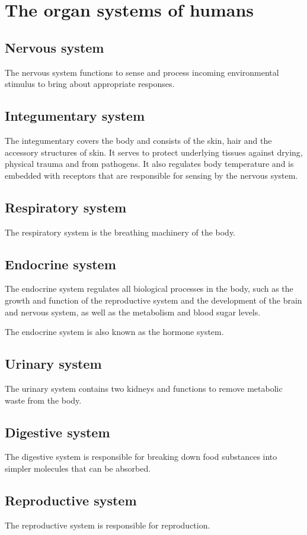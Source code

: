 \documentclass[11pt]{article}
\begin{document}
\section{The organ systems of humans}
\label{sec:org41d5632}

\subsection{Nervous system}
\label{sec:orgd522b90}
The nervous system functions to sense and process incoming environmental stimulus to bring about appropriate responses.
\subsection{Integumentary system}
\label{sec:orgb06c1d0}
The integumentary covers the body and consists of the skin, hair and the accessory structures of skin. It serves to protect underlying tissues against drying, physical trauma and from pathogens. It also regulates body temperature and is embedded with receptors that are responsible for sensing by the nervous system.
\subsection{Respiratory system}
\label{sec:org1ab36f4}
The respiratory system is the breathing machinery of the body.
\subsection{Endocrine system}
\label{sec:org375b59a}
The endocrine system regulates all biological processes in the body, such as the growth and function of the reproductive system and the development of the brain and nervous system, as well as the metabolism and blood sugar levels.


The endocrine system is also known as the hormone system.
\subsection{Urinary system}
\label{sec:orge70d77f}
The urinary system contains two kidneys and functions to remove metabolic waste from the body.
\subsection{Digestive system}
\label{sec:org651cd2a}
The digestive system is responsible for breaking down food substances into simpler molecules that can be absorbed.
\subsection{Reproductive system}
\label{sec:org081a943}
The reproductive system is responsible for reproduction.
\end{document}
